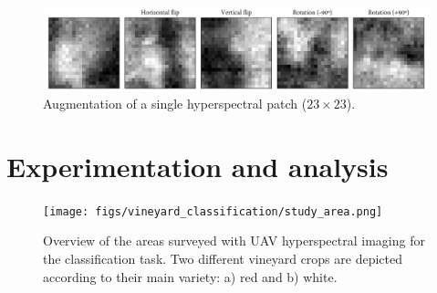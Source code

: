 \begin{figure}[ht]
    \centering
    \includegraphics[width=\linewidth]{figs/vineyard_classification/patch_augmentation.png}
	\caption{Augmentation of a single hyperspectral patch ($23\times23$). }
	\label{fig:patch_augmentation}
\end{figure}

\section{Experimentation and analysis}

\begin{figure}[bht]
    \centering
    \texttt{[image: figs/vineyard\_classification/study\_area.png]}
	\caption{Overview of the areas surveyed with UAV hyperspectral imaging for the classification task. Two different vineyard crops are depicted according to their main variety: a) red and b) white. }
	\label{fig:vineyard_study_area}
\end{figure}

